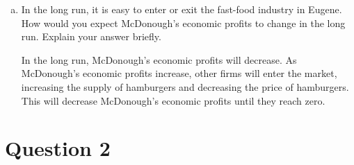 \documentclass{article}
\newcommand{\question}[1]{\pagebreak\section{Question #1}}
\begin{document}
\begin{enumerate}[(a)]
\begin{center}
    \end{center}

    \item In the long run, it is easy to enter or exit the fast-food industry in Eugene. How would you expect McDonough's economic profits to change in the long run. Explain your answer briefly.

    In the long run, McDonough's economic profits will decrease. As McDonough's economic profits increase, other firms will enter the market, increasing the supply of hamburgers and decreasing the price of hamburgers. This will decrease McDonough's economic profits until they reach zero.

\end{enumerate}

\pagebreak

\question{2}
\end{document}
